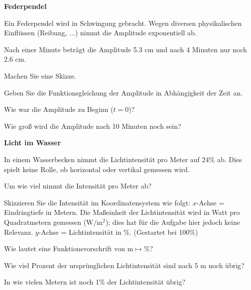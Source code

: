 

\bbwActAufgabenNr{} \textbf{Federpendel}

Ein Federpendel wird in Schwingung gebracht. Wegen diversen
physikalischen Einflüssen (Reibung, ...) nimmt die Amplitude
exponentiell ab.

Nach einer Minute beträgt die Amplitude 5.3 cm und nach 4 Minuten nur noch
2.6 cm.

\begin{bbwAufgabenBlock}

\item Machen Sie eine Skizze.
\item Geben Sie die Funktionsgleichung der Amplitude in Abhängigkeit
der Zeit an.
      
\item Wie war die Amplitude zu Beginn ($t=0$)?

\item Wie groß wird die Amplitude nach 10 Minuten noch sein?
\end{bbwAufgabenBlock}
\platzFuerBerechnungenBisEndeSeite{}





\bbwActAufgabenNr{} \textbf{Licht im Wasser}

In einem Wasserbecken nimmt die Lichtintensität pro Meter auf 24\% ab.
Dies spielt keine Rolle, ob horizontal oder vertikal gemessen wird.


\begin{bbwAufgabenBlock}

 \item Um wie viel nimmt die Intensität pro Meter ab? 
  
\item Skizzieren Sie die Intensität im Koordinatensystem wie folgt:
   $x$-Achse = Eindringtiefe in Metern. Die Maßeinheit der
   Lichtintensität wird in Watt pro Quadratmetern gemessen ($\textrm{W}/\textrm{m}^2$); dies
   hat für die Aufgabe hier jedoch keine Relevanz.
   $y$-Achse = Lichtintensität in \%. (Gestartet bei 100\%)
\item Wie lautet eine Funktionsvorschrift von $\textrm{m}\mapsto \%$?
\item Wie viel Prozent der ursprünglichen Lichtintensität sind nach 5
   m noch übrig? 

\item In wie vielen Metern ist noch 1\% der Lichtintensität übrig?
\end{bbwAufgabenBlock}
\platzFuerBerechnungenBisEndeSeite{}


